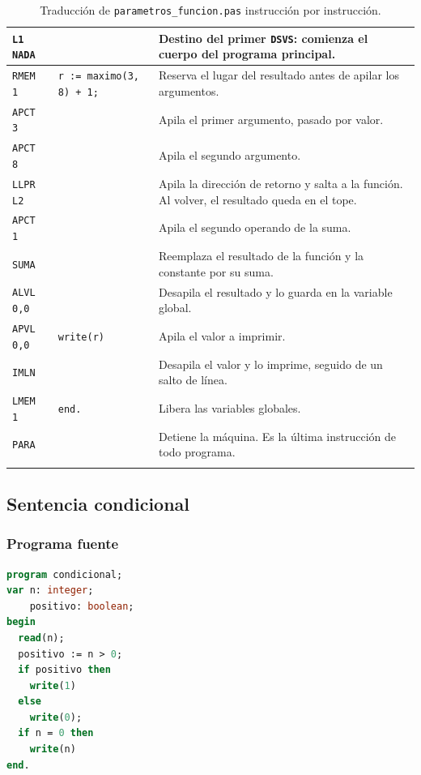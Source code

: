 \documentclass[12pt]{article}
\begin{document}
\begin{longtable}{|p{3.2cm}|p{5cm}|p{7cm}|}
\hline
\texttt{L1 NADA} & \texttt{} & Destino del primer \texttt{DSVS}: comienza el cuerpo del programa principal. \\
\hline
\texttt{RMEM 1} & \texttt{r := maximo(3, 8) + 1;} & Reserva el lugar del resultado antes de apilar los argumentos. \\
\hline
\texttt{APCT 3} & \texttt{} & Apila el primer argumento, pasado por valor. \\
\hline
\texttt{APCT 8} & \texttt{} & Apila el segundo argumento. \\
\hline
\texttt{LLPR L2} & \texttt{} & Apila la dirección de retorno y salta a la función. Al volver, el resultado queda en el tope. \\
\hline
\texttt{APCT 1} & \texttt{} & Apila el segundo operando de la suma. \\
\hline
\texttt{SUMA} & \texttt{} & Reemplaza el resultado de la función y la constante por su suma. \\
\hline
\texttt{ALVL 0,0} & \texttt{} & Desapila el resultado y lo guarda en la variable global. \\
\hline
\texttt{APVL 0,0} & \texttt{write(r)} & Apila el valor a imprimir. \\
\hline
\texttt{IMLN} & \texttt{} & Desapila el valor y lo imprime, seguido de un salto de línea. \\
\hline
\texttt{LMEM 1} & \texttt{end.} & Libera las variables globales. \\
\hline
\texttt{PARA} & \texttt{} & Detiene la máquina. Es la última instrucción de todo programa. \\
\hline
\caption{Traducción de \texttt{parametros\_funcion.pas} instrucción por instrucción.}
\label{tab:parametros-funcion}
\end{longtable}

\subsection{Sentencia condicional}


\subsubsection*{Programa fuente}
\begin{lstlisting}[frame=single, language=pascal, basicstyle=\ttfamily\small]
program condicional;
var n: integer;
    positivo: boolean;
begin
  read(n);
  positivo := n > 0;
  if positivo then
    write(1)
  else
    write(0);
  if n = 0 then
    write(n)
end.
\end{lstlisting}
\end{document}
